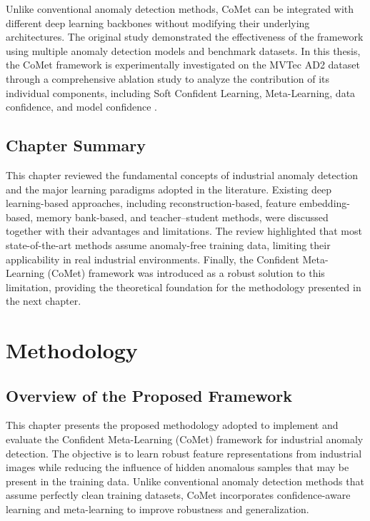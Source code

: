 \documentclass[12pt,openany,oneside]{book}
\begin{document}
Unlike conventional anomaly detection methods, CoMet can be integrated with different deep learning backbones without modifying their underlying architectures. The original study demonstrated the effectiveness of the framework using multiple anomaly detection models and benchmark datasets. In this thesis, the CoMet framework is experimentally investigated on the MVTec AD2 dataset through a comprehensive ablation study to analyze the contribution of its individual components, including Soft Confident Learning, Meta-Learning, data confidence, and model confidence \cite{aqeel2025comet}.
\section{Chapter Summary}
This chapter reviewed the fundamental concepts of industrial anomaly detection and the major learning paradigms adopted in the literature. Existing deep learning-based approaches, including reconstruction-based, feature embedding-based, memory bank-based, and teacher--student methods, were discussed together with their advantages and limitations. The review highlighted that most state-of-the-art methods assume anomaly-free training data, limiting their applicability in real industrial environments. Finally, the Confident Meta-Learning (CoMet) framework was introduced as a robust solution to this limitation, providing the theoretical foundation for the methodology presented in the next chapter.

\chapter{Methodology}
\label{chap:method}

\section{Overview of the Proposed Framework}

This chapter presents the proposed methodology adopted to implement and evaluate the Confident Meta-Learning (CoMet) framework for industrial anomaly detection. The objective is to learn robust feature representations from industrial images while reducing the influence of hidden anomalous samples that may be present in the training data. Unlike conventional anomaly detection methods that assume perfectly clean training datasets, CoMet incorporates confidence-aware learning and meta-learning to improve robustness and generalization.
\end{document}
